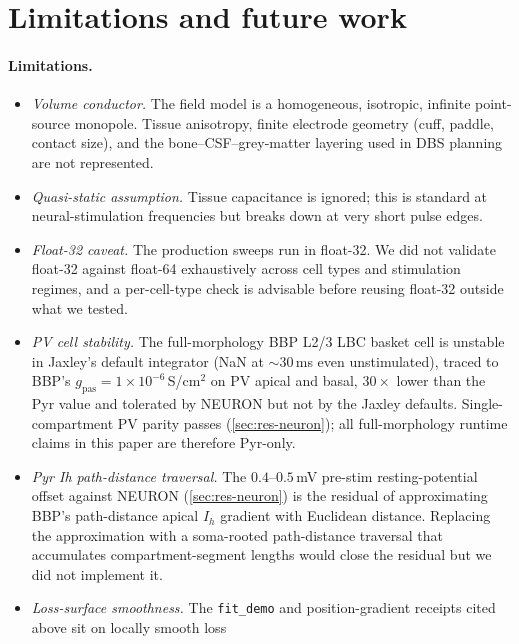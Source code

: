 \section{Limitations and future work}\label{sec:limitations}

\paragraph{Limitations.}
\begin{itemize}
  \item \emph{Volume conductor.} The field model is a homogeneous,
  isotropic, infinite point-source monopole. Tissue anisotropy,
  finite electrode geometry (cuff, paddle, contact size), and the
  bone--CSF--grey-matter layering used in DBS planning are not
  represented.
  \item \emph{Quasi-static assumption.} Tissue capacitance is ignored;
  this is standard at neural-stimulation frequencies but breaks down at
  very short pulse edges.
  \item \emph{Float-32 caveat.} The production sweeps run in float-32.
  We did not validate float-32 against float-64 exhaustively across
  cell types and stimulation regimes, and a per-cell-type check is
  advisable before reusing float-32 outside what we tested.
  \item \emph{PV cell stability.} The full-morphology BBP L2/3 LBC
  basket cell is unstable in Jaxley's default integrator (NaN at
  $\sim\!30\,$ms even unstimulated), traced to BBP's
  $g_\mathrm{pas} = 1\!\times\!10^{-6}\,$S/cm$^2$ on PV apical and
  basal, $30\times$ lower than the Pyr value and tolerated by NEURON
  but not by the Jaxley defaults. Single-compartment PV parity passes
  (\cref{sec:res-neuron}); all full-morphology runtime claims in this
  paper are therefore Pyr-only.
  \item \emph{Pyr Ih path-distance traversal.} The
  $0.4\text{--}0.5\,$mV pre-stim resting-potential offset against
  NEURON (\cref{sec:res-neuron}) is the residual of approximating
  BBP's path-distance apical $I_h$ gradient with Euclidean distance.
  Replacing the approximation with a soma-rooted path-distance
  traversal that accumulates compartment-segment lengths would close
  the residual but we did not implement it.
  \item \emph{Loss-surface smoothness.} The \texttt{fit\_demo} and
  position-gradient receipts cited above sit on locally smooth loss

\end{itemize}
